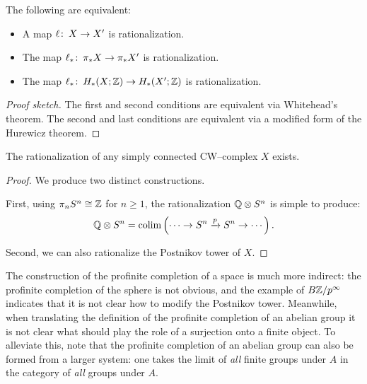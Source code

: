\begin{lemma}
The following are equivalent:
\begin{itemize}
    \item A map $\ell\colon\thinspace X \to X'$ is rationalization.
    \item The map $\ell_* \colon\thinspace \pi_* X \to \pi_* X'$ is rationalization.
    \item The map $\ell_* \colon\thinspace H_*(X; \mathbb Z) \to H_*(X'; \mathbb Z)$ is rationalization.
\end{itemize}
\end{lemma}
\begin{proof}[Proof sketch]
The first and second conditions are equivalent via Whitehead's theorem.
The second and last conditions are equivalent via a modified form of the Hurewicz theorem.
\end{proof}

\begin{theorem}
The rationalization of any simply connected CW--complex $X$ exists.
\marginnote{}
\end{theorem}
\begin{proof}
We produce two distinct constructions.

First, using $\pi_n S^n \cong \mathbb Z$ for $n \ge 1$, the rationalization $\mathbb Q \otimes S^n$ is simple to produce: \[\mathbb Q \otimes S^n = \operatorname{colim} \left( \cdots \to S^n \xrightarrow{p} S^n \to \cdots \right).\]

Second, we can also rationalize the Postnikov tower of $X$.
\end{proof}

The construction of the profinite completion of a space is much more indirect: the profinite completion of the sphere is not obvious, and the example of $B\mathbb Z/p^\infty$ indicates that it is not clear how to modify the Postnikov tower.
Meanwhile, when translating the definition of the profinite completion of an abelian group it is not clear what should play the role of a surjection onto a finite object.
To alleviate this, note that the profinite completion of an abelian group can also be formed from a larger system: one takes the limit of \emph{all} finite groups under $A$ in the category of \emph{all} groups under $A$.

